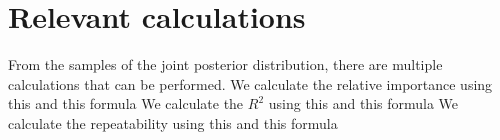 \section{Relevant calculations}
From the samples of the joint posterior distribution, there are multiple calculations that can be performed. 
We calculate the relative importance using this and this formula
We calculate the $R^2$ using this and this formula
We calculate the repeatability using this and this formula
